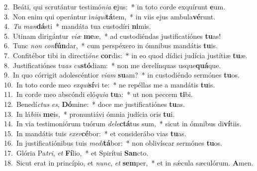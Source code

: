 {2.~}Beáti, qui scrutántur testimó\textit{ni}\textit{a} \textbf{e}jus:~* in toto corde exquírunt \textbf{e}um.\\
{3.~}Non enim qui operántur i\textit{ni}\textit{qui}\textbf{tá}tem,~* in viis ejus ambula\textbf{vé}runt.\\
{4.~}\textit{Tu} \textit{man}\textbf{dá}sti~* mandáta tua custodíri \textbf{ni}mis.\\
{5.~}Utinam dirigántur \textit{vi}\textit{æ} \textbf{me}æ,~* ad custodiéndas justificatiónes \textbf{tu}as!\\
{6.~}Tunc \textit{non} \textit{con}\textbf{fún}dar,~* cum perspéxero in ómnibus mandátis \textbf{tu}is.\\
{7.~}Confitébor tibi in directi\textit{ó}\textit{ne} \textbf{cor}dis:~* in eo quod dídici judícia justítiæ \textbf{tu}æ.\\
{8.~}Justificatiónes tu\textit{as} \textit{cu}\textbf{stó}diam:~* non me derelínquas usque\textbf{quá}que.\\
{9.~}In quo córrigit adolescéntior \textit{vi}\textit{am} \textbf{su}am?~* in custodiéndo sermónes \textbf{tu}os.\\
{10.~}In toto corde meo \textit{ex}\textit{qui}\textbf{sí}vi te:~* ne repéllas me a mandátis \textbf{tu}is.\\
{11.~}In corde meo abscóndi eló\textit{qui}\textit{a} \textbf{tu}a:~* ut non peccem \textbf{ti}bi.\\
{12.~}Benedí\textit{ctus} \textit{es}, \textbf{Dó}mine:~* doce me justificatiónes \textbf{tu}as.\\
{13.~}In lá\textit{bi}\textit{is} \textbf{me}is,~* pronuntiávi ómnia judícia oris \textbf{tu}i.\\
{14.~}In via testimoniórum tuórum \textit{de}\textit{le}\textbf{ctá}tus sum,~* sicut in ómnibus di\textbf{ví}tiis.\\
{15.~}In mandátis tuis \textit{e}\textit{xer}\textbf{cé}bor:~* et considerábo vias \textbf{tu}as.\\
{16.~}In justificatiónibus tuis \textit{me}\textit{di}\textbf{tá}bor:~* non oblivíscar sermónes \textbf{tu}os.\\
{17.~}Glória Pa\textit{tri}, \textit{et} \textbf{Fí}lio,~* et Spirítui \textbf{San}cto.\\
{18.~}Sicut erat in princípio, et \textit{nunc}, \textit{et} \textbf{sem}per,~* et in sǽcula sæculórum. \textbf{A}men.\\
